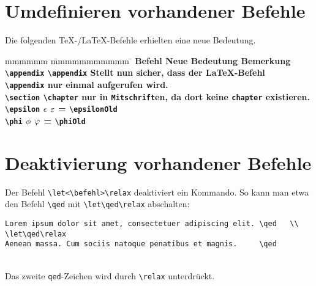 		\section{Umdefinieren vorhandener Befehle}
			Die folgenden \TeX-/\LaTeX-Befehle erhielten eine neue Bedeutung. 
			\begin{tabbing}
				mmmmmm			\= mmmmmmmmmmm			\= \kill
				\bf Befehl 		\> \bf Neue Bedeutung	\> \bf Bemerkung																										\\
				\verb|\appendix|\> \verb|\appendix|		\> Stellt nun sicher, dass der \LaTeX-Befehl 																			\\
								\> 						\> \verb|\appendix| nur einmal aufgerufen wird.																			\\
				\verb|\section|	\> \verb|\chapter|		\> nur in \texttt{Mitschrift}en, da dort keine \texttt{chapter} existieren.												\\
				\verb|\epsilon|	\> $\epsilon$			\> $\epsilonOld$ = \verb|\epsilonOld|																					\\
				\verb|\phi|		\> $\phi$				\> $\phiOld$ = \verb|\phiOld|
			\end{tabbing}
		\section{Deaktivierung vorhandener Befehle}
			Der Befehl \verb|\let<\befehl>\relax| deaktiviert ein Kommando. So kann man etwa den Befehl \verb|\qed| mit \verb|\let\qed\relax| abschalten:
			\begin{verbatim}
Lorem ipsum dolor sit amet, consectetuer adipiscing elit. \qed   \\
\let\qed\relax 
Aenean massa. Cum sociis natoque penatibus et magnis.     \qed
			\end{verbatim} 
			
			\vspace*{1em}\\
			  Das zweite \texttt{qed}-Zeichen wird durch \verb|\relax| unterdrückt.
			
